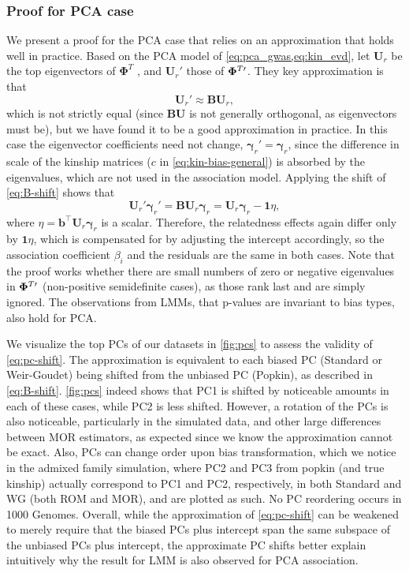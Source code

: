 \documentclass[11pt]{article}
\newcommand{\kinMat}[1][T]{%
  \ensuremath{%
    \mathbf{\Phi}^{#1}
  }%
  \xspace%
}%
\newcommand{\kinMatPrime}{%
  \ensuremath{%
    \mathbf{\Phi}^{T\prime}
  }%
  \xspace%
}%
\begin{document}
\subsubsection{Proof for PCA case}

We present a proof for the PCA case that relies on an approximation that holds well in practice.
Based on the PCA model of \cref{eq:pca_gwas,eq:kin_evd}, let $\mathbf{U}_r$ be the top eigenvectors of \kinMat, and $\mathbf{U}_r'$ those of $\kinMatPrime$.
They key approximation is that
\begin{equation}
  \label{eq:pc-shift}
  \mathbf{U}_r' \approx \mathbf{B} \mathbf{U}_r,
\end{equation}
which is not strictly equal (since $\mathbf{B} \mathbf{U}$ is not generally orthogonal, as eigenvectors must be), but we have found it to be a good approximation in practice.
In this case the eigenvector coefficients need not change, $\boldsymbol{\gamma}_r' = \boldsymbol{\gamma}_r$, since the difference in scale of the kinship matrices ($c$ in \cref{eq:kin-bias-general}) is absorbed by the eigenvalues, which are not used in the association model.
Applying the shift of \cref{eq:B-shift} shows that
$$
\mathbf{U}_r' \boldsymbol{\gamma}_r'
=
\mathbf{B} \mathbf{U}_r \boldsymbol{\gamma}_r
=
\mathbf{U}_r \boldsymbol{\gamma}_r - \mathbf{1} \eta,
$$
where
$\eta = \mathbf{b}^\intercal \mathbf{U}_r \boldsymbol{\gamma}_r$
is a scalar.
Therefore, the relatedness effects again differ only by $\mathbf{1} \eta$, which is compensated for by adjusting the intercept accordingly, so the association coefficient $\beta_i$ and the residuals are the same in both cases.
Note that the proof works whether there are small numbers of zero or negative eigenvalues in $\kinMatPrime$ (non-positive semidefinite cases), as those rank last and are simply ignored.
The observations from LMMs, that p-values are invariant to bias types, also hold for PCA.

We visualize the top PCs of our datasets in \cref{fig:pcs} to assess the validity of \cref{eq:pc-shift}.
The approximation is equivalent to each biased PC (Standard or Weir-Goudet) being shifted from the unbiased PC (Popkin), as described in \cref{eq:B-shift}.
\cref{fig:pcs} indeed shows that PC1 is shifted by noticeable amounts in each of these cases, while PC2 is less shifted.
However, a rotation of the PCs is also noticeable, particularly in the simulated data, and other large differences between MOR estimators, as expected since we know the approximation cannot be exact.
Also, PCs can change order upon bias transformation, which we notice in the admixed family simulation, where PC2 and PC3 from popkin (and true kinship) actually correspond to PC1 and PC2, respectively, in both Standard and WG (both ROM and MOR), and are plotted as such.
No PC reordering occurs in 1000 Genomes.
Overall, while the approximation of \cref{eq:pc-shift} can be weakened to merely require that the biased PCs plus intercept span the same subspace of the unbiased PCs plus intercept, the approximate PC shifts better explain intuitively why the result for LMM is also observed for PCA association.
\end{document}
